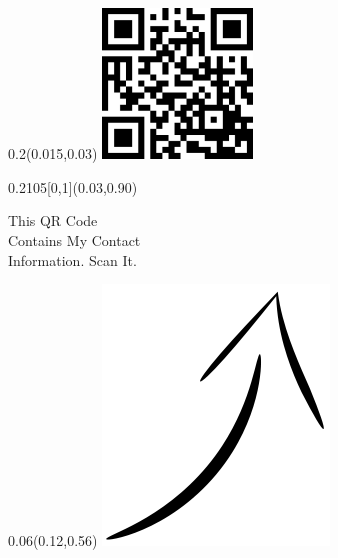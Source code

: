 \documentclass[a4paper]{article}
\begin{document}

\begin{textblock}{0.2}(0.015,0.03)
  \includegraphics[width=4cm]{fig/main}
\end{textblock}

\begin{textblock}{0.2105}[0,1](0.03,0.90) 
  \begin{small}\textsf{This QR Code \\ Contains My Contact \\
      Information.  Scan It.}\end{small}
\end{textblock}

\begin{textblock}{0.06}(0.12,0.56)
  \includegraphics[width=\textwidth, angle=30]{fig/arrow}
\end{textblock}
\end{document}
